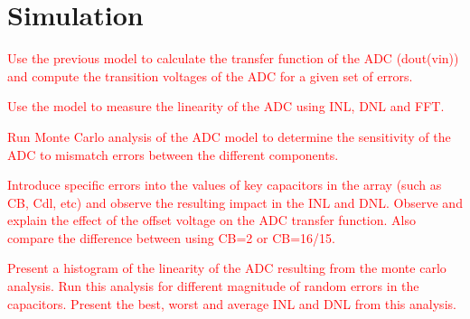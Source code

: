 \section{Simulation}

\textcolor{red}{Use the previous model to calculate the transfer function of the ADC (dout(vin))
and compute the transition voltages of the ADC for a given set of errors.}

\textcolor{red}{Use the model to measure the linearity of the ADC using INL, DNL and FFT.}

\textcolor{red}{Run Monte Carlo analysis of the ADC model to determine the sensitivity of the
ADC to mismatch errors between the different components.}

\textcolor{red}{Introduce specific errors into the values of key capacitors in the array (such as CB, Cdl, etc) and observe the resulting impact in the INL and DNL. Observe and explain the effect of the offset voltage on the ADC transfer function. Also compare the difference between using CB=2 or CB=16/15.}

\textcolor{red}{Present a histogram of the linearity of the ADC resulting from the monte carlo analysis. Run this analysis for different magnitude of random errors in the capacitors. Present the best, worst and average INL and DNL from this analysis.}